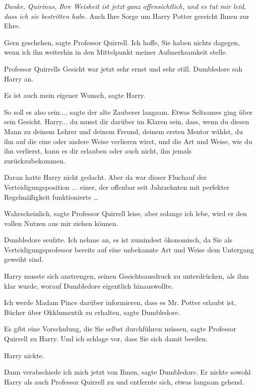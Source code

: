 \glqq \emph{Danke, Quirinus, Ihre Weisheit ist jetzt ganz offensichtlich, und es
tut mir leid, dass ich sie bestritten habe.} Auch Ihre Sorge um Harry Potter
gereicht Ihnen zur Ehre.\grqq{}

\glqq Gern geschehen\grqq{}, sagte Professor Quirrell. \glqq Ich hoffe, Sie
haben nichts dagegen, wenn ich ihn weiterhin in den Mittelpunkt meiner
Aufmerksamkeit stelle.\grqq{}

Professor Quirrells Gesicht war jetzt sehr ernst und sehr still. Dumbledore sah
Harry an.

\glqq Es ist auch mein eigener Wunsch\grqq{}, sagte Harry.

\glqq So soll es also sein...\grqq{}, sagte der alte Zauberer langsam. Etwas
Seltsames ging über sein Gesicht. \glqq Harry... du musst dir darüber im Klaren
sein, dass, wenn du diesen Mann zu deinem Lehrer und deinem Freund, deinem
ersten Mentor wählst, du ihn auf die eine oder andere Weise verlieren wirst, und
die Art und Weise, wie du ihn verlierst, kann es dir erlauben oder auch nicht,
ihn jemals zurückzubekommen.\grqq{}

Daran hatte Harry nicht gedacht. Aber da war dieser Fluchauf der
Verteidigungsposition ... einer, der offenbar seit Jahrzehnten mit perfekter
Regelmäßigkeit funktionierte …

\glqq Wahrscheinlich\grqq{}, sagte Professor Quirrell leise, \glqq aber solange
ich lebe, wird er den vollen Nutzen aus mir ziehen können.\grqq{}

Dumbledore seufzte. \glqq Ich nehme an, es ist zumindest ökonomisch, da Sie als
Verteidigungsprofessor bereits auf eine unbekannte Art und Weise dem Untergang
geweiht sind.\grqq{}

Harry musste sich anstrengen, seinen Gesichtsausdruck zu unterdrücken, als ihm
klar wurde, worauf Dumbledore eigentlich hinauswollte.

\glqq Ich werde Madam Pince darüber informieren, dass es Mr. Potter erlaubt ist,
Bücher über Okklumentik zu erhalten\grqq{}, sagte Dumbledore.

\glqq Es gibt eine Vorschulung, die Sie selbst durchführen müssen\grqq{}, sagte
Professor Quirrell zu Harry. \glqq Und ich schlage vor, dass Sie sich damit
beeilen.\grqq{}

Harry nickte.

\glqq Dann verabschiede ich mich jetzt von Ihnen\grqq{}, sagte Dumbledore. Er
nickte sowohl Harry als auch Professor Quirrell zu und entfernte sich, etwas
langsam gehend.

